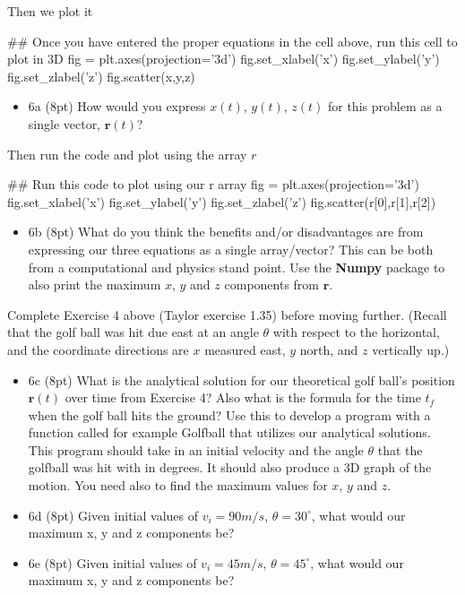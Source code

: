 \documentclass[%
oneside,                 %
final,                   %
10pt]{article}
\begin{document}
\epycod

Then we plot it







\bpycod
## Once you have entered the proper equations in the cell above, run this cell to plot in 3D
fig = plt.axes(projection='3d')
fig.set_xlabel('x')
fig.set_ylabel('y')
fig.set_zlabel('z')
fig.scatter(x,y,z)

\epycod


\begin{itemize}
\item 6a (8pt) How would you express $x(t)$, $y(t)$, $z(t)$ for this problem as a single vector, $\bm{r}(t)$?
\end{itemize}

\noindent
Then run the code and plot using the array $r$







\bpycod
## Run this code to plot using our r array 
fig = plt.axes(projection='3d')
fig.set_xlabel('x')
fig.set_ylabel('y')
fig.set_zlabel('z')
fig.scatter(r[0],r[1],r[2])

\epycod


\begin{itemize}
\item 6b (8pt) What do you think the benefits and/or disadvantages are from expressing our three equations as a single array/vector? This can be both from a computational and physics stand point. Use the \textbf{Numpy} package to also print the maximum $x$, $y$ and $z$ components from $\bm{r}$.
\end{itemize}

\noindent
Complete Exercise 4 above (Taylor exercise 1.35) before moving further. (Recall that the golf ball was hit due east at an angle $\theta$ with respect to the horizontal, and the coordinate directions are $x$ measured east, $y$ north, and $z$ vertically up.)

\begin{itemize}
\item 6c (8pt) What is the analytical solution for our theoretical golf ball's position $\bm{r}(t)$ over time from Exercise 4?  Also what is the formula for the time $t_f$ when the golf ball hits the ground? Use this to develop a program with a function called for example Golfball that utilizes our analytical solutions. This program should take in an initial velocity and the angle $\theta$ that the golfball was hit with in degrees. It should also produce  a 3D graph of the motion. You need also to find the maximum values for $x$, $y$ and $z$.

\item 6d (8pt) Given initial values of $v_i = 90 m/s$, $\theta = 30^{\circ}$, what would our maximum x, y and z components be? 

\item 6e (8pt) Given initial values of $v_i = 45 m/s$, $\theta = 45^{\circ}$, what would our maximum x, y and z components be? 
\end{itemize}

\noindent


\end{document}
